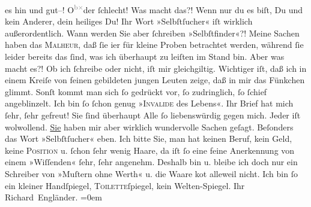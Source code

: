 \begin{ledgroupsized}[t]{13cm}
               es hin und gut–! O\substVorne{}\textsuperscript{\textcolor{gray}{b}\textcolor{gray}{×}}\substDazwischen{}de\substHinten{}r ſchlecht! Was macht das?! Wenn nur du es biſt, Du und kein Anderer, dein
               heiliges Du! Ihr Wort »Selbſtſucher« iſt wirklich {\pb}außerordentlich. Wann werden Sie aber ſchreiben »Selbſtfinder«?!\pend
           \pstart
            Meine Sachen haben das \textsc{Malheur}, daß ſie i{\geminationm}er für
               kleine Proben betrachtet werden, während ſie leider bereits das ſind, was ich
               überhaupt zu leiſten im Stand bin. Aber was macht es?! Ob ich ſchreibe oder nicht,
               iſt mir gleichgiltig.\pend
           \pstart
           Wichtiger iſt, daß ich in einem Kreiſe von feinen gebildeten jungen Leuten zeige, daß
                   in mir das Fünkchen glimmt. Sonſt kommt man sich ſo gedrückt vor, ſo
               zudringlich, ſo ſchief angeblinzelt. Ich bin ſo ſchon genug »\textsc{Invalide} des Lebens«.\pend
           \pstart
           Ihr Brief hat mich ſehr, ſehr gefreut! {\pb} Sie ſind überhaupt Alle ſo liebenswürdig gegen mich. Jeder iſt wolwollend. \uline{Sie} haben mir aber wirklich wundervolle Sachen geſagt.
               Beſonders das Wort »Selbſtſucher« eben.\pend
           \pstart
           Ich bitte Sie, man hat keinen Beruf, kein Geld, keine \textsc{Position} u. ſchon ſehr wenig Haare, da iſt ſo eine feine Anerkennung von
               einem »Wiſſenden« ſehr, ſehr angenehm.\pend
           \pstart
           Deshalb bin u. bleibe ich doch nur ein Schreiber von »Muſtern ohne Werth« u. die
               Waare ko{\geminationm}t alleweil nicht. Ich bin ſo ein kleiner
               Handſpiegel, \textsc{Toilette}ſpiegel, kein  Welten-Spiegel.\pend
           \pstart
           Ihr{\\[\baselineskip]}\spacefill\mbox{Richard Engländer.}\pend
           \leftskip=0em{}
         
         \endnumbering{}\end{ledgroupsized}  \newcommand{\dateiname}{L00351}\newcommand{\titel}{Peter Altenberg an Arthur Schnitzler, [12. 7. 1894?]}\newcommand{\editorInnen}{Martin Anton Müller und Gerd-Hermann Susen}
      